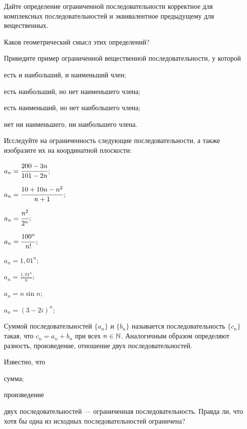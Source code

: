 \documentclass[a4paper, 12pt, num=24]{listok}
\begin{document}
\begin{problem}
\begin{probparts}
	\item Дайте определение ограниченной последовательности корректное для комплексных последовательностей и эквивалентное предыдущему для вещественных.
	\item Каков геометрический смысл этих определений?
\end{probparts}
\end{problem}
\begin{problem}
	Приведите пример ограниченной вещественной последовательности, у которой
	\begin{probparts}
		\item есть и наибольший, и наименьший член;
		\item есть наибольший, но нет наименьшего члена;
		\item есть наименьший, но нет наибольшего члена;
		\item нет ни наименьшего, ни наибольшего члена.
	\end{probparts}
\end{problem}
\begin{problem}\label{exfirst}
	Исследуйте на ограниченность следующие последовательности, а также изобразите их на координатной плоскости:
	\begin{multienum}{3}
		\item $a_n = \cfrac{200 - 3n}{101 - 2n}$;
		\item $a_n = \cfrac{10 + 10n - n^2}{n + 1}$;
		\item $a_n = \cfrac{n^2}{2^n}$;
		\item $a_n = \cfrac{100^n}{n!}$;
		\item $a_n = 1,{}01^n$;
		\item $a_n = \frac{1,{}01^n}n$;
		\item $a_n = n \sin{n}$;
		\item $a_n = {(3 - 2i)}^n$;
	\end{multienum}
\end{problem}
\begin{definition}
	Суммой последовательностей $\{a_n\}$ и $\{b_n\}$ называется последовательность $\{c_n\}$ такая,
	что $c_n = a_n + b_n$ при всех $n \in \mathbb{N}$.
	Аналогичным образом определяют разность, произведение, отношение двух последовательностей.
\end{definition}
\begin{problem}
	Известно, что
	\begin{probparts}
		\item сумма; 
		\item произведение
	\end{probparts}
	двух последовательностей --- ограниченная последовательность.
	Правда ли, что хотя бы одна из исходных последовательностей ограничена?
\end{problem}
\end{document}
